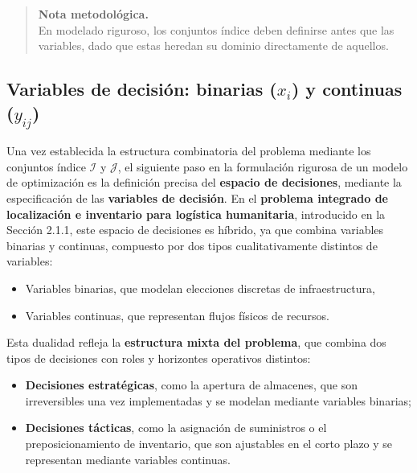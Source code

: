 \documentclass[
  spanish,
  us-letterpaper,
  DIV=11,
  numbers=noendperiod]{scrreprt}
\providecommand{\tightlist}{%
  \setlength{\itemsep}{0pt}\setlength{\parskip}{0pt}}
\numberwithin{equation}{section}
\begin{document}
\begin{quote}
\textbf{Nota metodológica.}\\
En modelado riguroso, los conjuntos índice deben definirse antes que las
variables, dado que estas heredan su dominio directamente de aquellos.
\end{quote}

\subsection{\texorpdfstring{Variables de decisión: binarias (\(x_i\)) y
continuas
(\(y_{ij}\))}{Variables de decisión: binarias (x\_i) y continuas (y\_\{ij\})}}\label{variables-de-decisiuxf3n-binarias-x_i-y-continuas-y_ij}

Una vez establecida la estructura combinatoria del problema mediante los
conjuntos índice \(\mathcal{I}\) y \(\mathcal{J}\), el siguiente paso en
la formulación rigurosa de un modelo de optimización es la definición
precisa del \textbf{espacio de decisiones}, mediante la especificación
de las \textbf{variables de decisión}. En el \textbf{problema integrado
de localización e inventario para logística humanitaria}, introducido en
la Sección 2.1.1, este espacio de decisiones es híbrido, ya que combina
variables binarias y continuas, compuesto por dos tipos cualitativamente
distintos de variables:

\begin{itemize}
\tightlist
\item
  Variables binarias, que modelan elecciones discretas de
  infraestructura,
\item
  Variables continuas, que representan flujos físicos de recursos.
\end{itemize}

Esta dualidad refleja la \textbf{estructura mixta del problema}, que
combina dos tipos de decisiones con roles y horizontes operativos
distintos:

\begin{itemize}
\tightlist
\item
  \textbf{Decisiones estratégicas}, como la apertura de almacenes, que
  son irreversibles una vez implementadas y se modelan mediante
  variables binarias;
\item
  \textbf{Decisiones tácticas}, como la asignación de suministros o el
  preposicionamiento de inventario, que son ajustables en el corto plazo
  y se representan mediante variables continuas.
\end{itemize}
\end{document}
